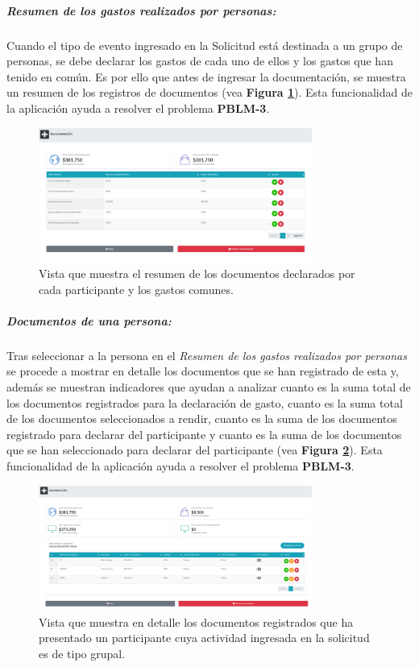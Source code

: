     \subparagraph{\emph{Resumen de los gastos realizados por personas: }} Cuando el tipo de evento ingresado en la Solicitud está destinada a un grupo de personas, se debe declarar los gastos de cada uno de ellos y los gastos que han tenido en común. Es por ello que antes de ingresar la documentación, se muestra un resumen de los registros de documentos (vea \textbf{Figura \ref{fig: RendicionPersonas}}). Esta funcionalidad de la aplicación ayuda a resolver el problema \textbf{PBLM-3}.

    \begin{figure}[htbp]
        \centering
        \includegraphics[width= 0.8\textwidth]{Imagenes/Rendicion_Personas2.PNG}
        \caption{\label{fig: RendicionPersonas}Vista que muestra el resumen de los documentos declarados por cada participante y los gastos comunes.}
    \end{figure}

    \subparagraph{\emph{Documentos de una persona: }} Tras seleccionar a la persona en el \textit{Resumen de los gastos realizados por personas} se procede a mostrar en detalle los documentos que se han registrado de esta y, además se muestran indicadores que ayudan a analizar cuanto es la suma total de los documentos registrados para la declaración de gasto, cuanto es la suma total de los documentos seleccionados a rendir, cuanto es la suma de los documentos registrado para declarar del participante y cuanto es la suma de los documentos que se han seleccionado para declarar del participante (vea \textbf{Figura \ref{fig: DocumentosParticipante}}). Esta funcionalidad de la aplicación ayuda a resolver el problema \textbf{PBLM-3}.

    
    \begin{figure}[htbp]
        \centering
        \includegraphics[width= 0.8\textwidth]{Imagenes/Boletas_de_un_participante.PNG}
        \caption{\label{fig: DocumentosParticipante}Vista que muestra en detalle los documentos registrados que ha presentado un participante cuya actividad ingresada en la solicitud es de tipo grupal.}
    \end{figure}

